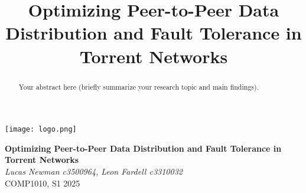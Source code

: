 \documentclass[a0,landscape]{a0poster}
\title{Optimizing Peer-to-Peer Data Distribution and Fault Tolerance in Torrent Networks}
\begin{document}
\maketitle

\begin{center}
    \begin{minipage}{0.3\textwidth}
        \texttt{[image: logo.png]} 
    \end{minipage}%
    \hfill
    \begin{minipage}{0.65\textwidth}
        \vspace{-0.5cm}
        \centering
        \huge \textbf{Optimizing Peer-to-Peer Data Distribution and Fault Tolerance in Torrent Networks} \\
        \vspace{0.3cm}
        \textit{Lucas Newman c3500964, Leon Fardell c3310032} \\
        \vspace{0.3cm}
        \small COMP1010, S1 2025
    \end{minipage}
\end{center}

\begin{abstract}
Your abstract here (briefly summarize your research topic and main findings).
\end{abstract}
\end{document}
